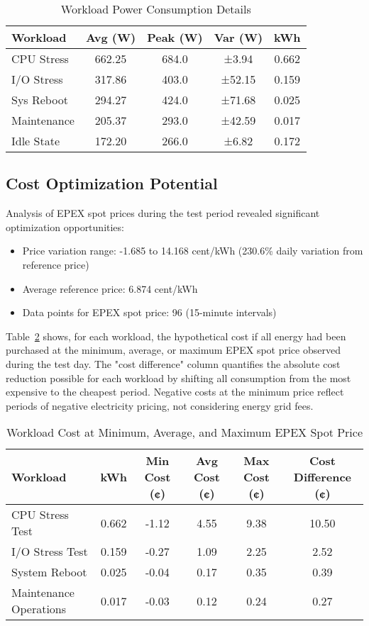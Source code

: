 \begin{table}[h]
\caption{Workload Power Consumption Details}
\label{tab:workload-comparison}
\begin{tabular}{@{}lcccc@{}}
\hline
\textbf{Workload} & \textbf{Avg (W)} & \textbf{Peak (W)} & \textbf{Var (W)} & \textbf{kWh} \\
\hline
CPU Stress & 662.25 & 684.0 & ±3.94 & 0.662 \\
I/O Stress & 317.86 & 403.0 & ±52.15 & 0.159 \\
Sys Reboot & 294.27 & 424.0 & ±71.68 & 0.025 \\
Maintenance & 205.37 & 293.0 & ±42.59 & 0.017 \\
Idle State & 172.20 & 266.0 & ±6.82 & 0.172 \\
\hline
\end{tabular}
\end{table}

\subsection{Cost Optimization Potential}
\label{results:optimization}
Analysis of EPEX spot prices during the test period revealed significant optimization opportunities:

\begin{itemize}[noitemsep,topsep=0pt]
    \item Price variation range: -1.685 to 14.168 cent/kWh (230.6\% daily variation from reference price)
    \item Average reference price: 6.874 cent/kWh
    \item Data points for EPEX spot price: 96 (15-minute intervals)
\end{itemize}

Table~\ref{tab:cost-comparison} shows, for each workload, the hypothetical cost if all energy 
had been purchased at the minimum, average, or maximum EPEX spot price observed during the test day. 
The "cost difference" column quantifies the absolute cost reduction possible for each workload 
by shifting all consumption from the most expensive to the cheapest period. Negative costs at the 
minimum price reflect periods of negative electricity pricing, not considering energy grid fees.
\newpage
\begin{table}[h]
    \caption{Workload Cost at Minimum, Average, and Maximum EPEX Spot Price}
    \label{tab:cost-comparison}
    \begin{tabular}{@{}lccccc@{}}
    \hline
    \textbf{Workload} & \textbf{kWh} & \textbf{Min Cost (¢)} & \textbf{Avg Cost (¢)} & \textbf{Max Cost (¢)} & \textbf{Cost Difference (¢)} \\
    \hline
    CPU Stress Test        & 0.662 & -1.12 & 4.55 & 9.38 & 10.50 \\
    I/O Stress Test        & 0.159 & -0.27 & 1.09 & 2.25 & 2.52 \\
    System Reboot          & 0.025 & -0.04 & 0.17 & 0.35 & 0.39 \\
    Maintenance Operations & 0.017 & -0.03 & 0.12 & 0.24 & 0.27 \\
    \hline
    \end{tabular}
    \end{table}

